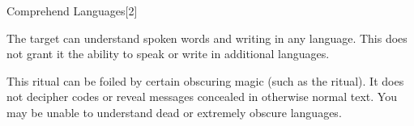 \begin{spellsection}{Comprehend Languages}[2]
    \begin{spellheader}
    \end{spellheader}
    \begin{spellcontent}
        \begin{spelltargetinginfo}
        \end{spelltargetinginfo}
        \begin{spelleffects}
            \spelleffect The target can understand spoken words and writing in any language. This does not grant it the ability to speak or write in additional languages.
            \spelldur \durlong
        \end{spelleffects}
    \end{spellcontent}
    \begin{spellfooter}
        \spellnotes This ritual can be foiled by certain obscuring magic (such as the  ritual). It does not decipher codes or reveal messages concealed in otherwise normal text. You may be unable to understand dead or extremely obscure languages.
    \end{spellfooter}
    \begin{spellaugments}
    \end{spellaugments}
\end{spellsection}

